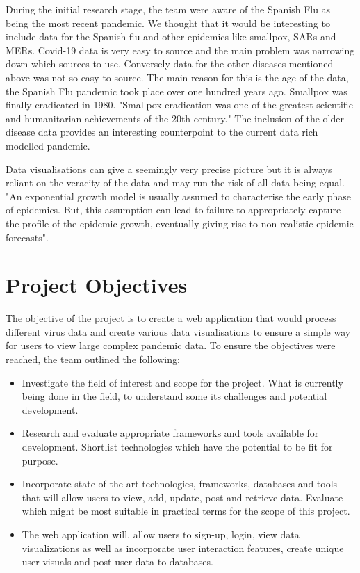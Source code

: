 During the initial research stage, the team were aware of the Spanish Flu as being the most recent pandemic. We thought that it would be interesting to include data for the Spanish flu and other epidemics like smallpox, SARs and MERs. Covid-19 data is very easy to source and the main problem was narrowing down which sources to use. Conversely data for the other diseases mentioned above was not so easy to source. The main reason for this is the age of the data, the Spanish Flu pandemic took place over one hundred years ago. Smallpox was finally eradicated in 1980. 
"Smallpox eradication was one of the greatest scientific and humanitarian achievements of the 20th century."\cite{Smallpox} The inclusion of the older disease data provides an interesting counterpoint to the current data rich modelled pandemic.

\vspace{2mm}

Data visualisations can give a seemingly very precise picture but it is always reliant on the veracity of the data and may run the risk of all data being equal. "An exponential growth model is usually assumed to characterise the early phase of epidemics. But, this assumption can lead to failure to appropriately capture the profile of the epidemic growth, eventually giving rise to non realistic epidemic forecasts"\cite{tovissode2020use}.



\section{Project Objectives}
The objective of the project is to create a web application that would process different virus data and create various data visualisations to ensure a simple way for users to view large complex pandemic data. 
To ensure the objectives were reached, the team outlined the following:

\begin{itemize}
  \item Investigate the field of interest and scope for the project.
  What is currently being done in the field, to understand some its challenges and potential development.
  
  \item Research and evaluate appropriate frameworks and tools available for development.
  Shortlist technologies which have the potential to be fit for purpose.
  
  \item Incorporate state of the art technologies, frameworks, databases and tools that will allow users to view, add, update, post and retrieve data.
  Evaluate which might be most suitable in practical terms for the scope of this project.
  \item The web application will, allow users to sign-up, login, view data visualizations as well as incorporate user interaction features, create unique user visuals and post user data to databases.
\end{itemize}

